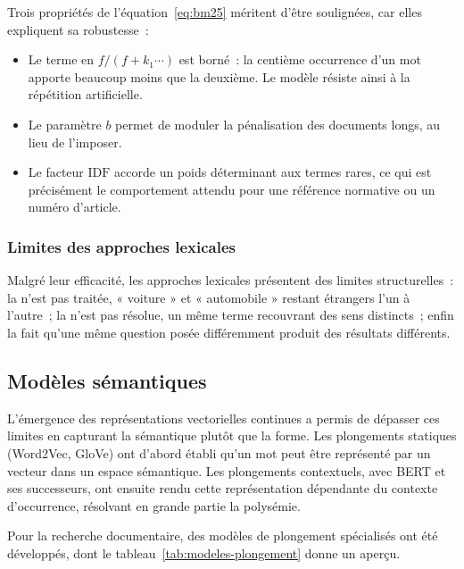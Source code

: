 Trois propriétés de l'équation~\eqref{eq:bm25} méritent d'être soulignées, car
elles expliquent sa robustesse~:

\begin{itemize}
  \item {} Le terme en $f/(f + k_1 \cdots)$
        est borné~: la centième occurrence d'un mot apporte beaucoup moins que
        la deuxième. Le modèle résiste ainsi à la répétition artificielle.
  \item {} Le paramètre $b$ permet
        de moduler la pénalisation des documents longs, au lieu de l'imposer.
  \item {} Le facteur $\mathrm{IDF}$ accorde
        un poids déterminant aux termes rares, ce qui est précisément le
        comportement attendu pour une référence normative ou un numéro d'article.
\end{itemize}

\subsubsection{Limites des approches lexicales}

Malgré leur efficacité, les approches lexicales présentent des limites
structurelles~: la  n'est pas traitée, « voiture » et
« automobile » restant étrangers l'un à l'autre~; la  n'est
pas résolue, un même terme recouvrant des sens distincts~; enfin la
 fait qu'une même question posée
différemment produit des résultats différents.

\subsection{Modèles sémantiques}

L'émergence des représentations vectorielles continues a permis de dépasser ces
limites en capturant la sémantique plutôt que la forme. Les plongements
statiques (Word2Vec, GloVe) ont d'abord établi qu'un mot peut être représenté
par un vecteur dans un espace sémantique. Les plongements contextuels, avec
BERT et ses successeurs, ont ensuite rendu cette représentation dépendante du
contexte d'occurrence, résolvant en grande partie la polysémie.

Pour la recherche documentaire, des modèles de plongement spécialisés ont été
développés, dont le tableau~\ref{tab:modeles-plongement} donne un aperçu.

